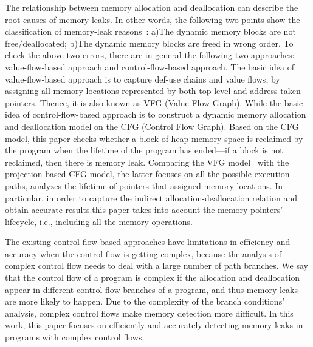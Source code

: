 The relationship between memory allocation and deallocation can describe the root causes of memory leaks. In other words, the following two points show the classification of memory-leak reasons~\cite{LCW13}: a)The dynamic memory blocks are not free/deallocated; b)The dynamic memory blocks are freed in wrong order.
To check the above two errors, there are in general the following two approaches: value-flow-based approach and control-flow-based approach. The basic idea of value-flow-based approach is to capture def-use chains and value flows, by assigning all memory locations represented by both top-level and address-taken pointers. Thence, it is also known as VFG (Value Flow Graph). While the basic idea of control-flow-based approach is to construct a dynamic memory allocation and deallocation model on the CFG (Control Flow Graph). Based on the CFG model, this paper checks whether a block of heap memory space is reclaimed by the program when the lifetime of the program has ended---if a block is not reclaimed, then there is memory leak. Comparing the VFG model~\cite{SYX12} with the projection-based CFG model, the latter focuses on all the possible execution paths, analyzes the lifetime of pointers that assigned memory locations. %
In particular, in order to capture the indirect allocation-deallocation relation and obtain accurate results.this paper takes into account the memory pointers' lifecycle, i.e., including all the memory operations.
 
The existing control-flow-based approaches have limitations in efficiency and accuracy when the control flow is getting complex, because the analysis of complex control flow needs to deal with a large number of path branches. %
We say that the control flow of a program is complex if the allocation and deallocation appear in different control flow branches of a program, and thus memory leaks are more likely to happen. Due to the complexity of the branch conditions' analysis, complex control flows make memory detection more difficult. %
In this work, this paper focuses on efficiently and accurately detecting memory leaks in programs with complex control flows.  
 
